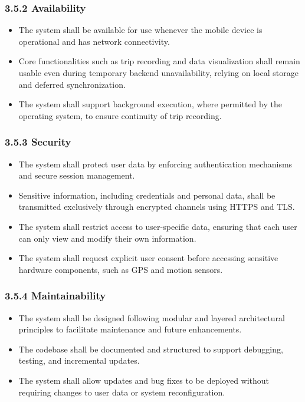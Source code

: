 \subsubsection{3.5.2 Availability}
\begin{itemize}
    \item The system shall be available for use whenever the mobile device is operational and has network connectivity.
    
    \item Core functionalities such as trip recording and data visualization shall remain usable even during temporary backend unavailability, relying on local storage and deferred synchronization.
    
    \item The system shall support background execution, where permitted by the operating system, to ensure continuity of trip recording.
\end{itemize}

\subsubsection{3.5.3 Security}
\begin{itemize}
    \item The system shall protect user data by enforcing authentication mechanisms and secure session management.
    
    \item Sensitive information, including credentials and personal data, shall be transmitted exclusively through encrypted channels using HTTPS and TLS.
    
    \item The system shall restrict access to user-specific data, ensuring that each user can only view and modify their own information.
    
    \item The system shall request explicit user consent before accessing sensitive hardware components, such as GPS and motion sensors.
\end{itemize}

\subsubsection{3.5.4 Maintainability}
\begin{itemize}
    \item The system shall be designed following modular and layered architectural principles to facilitate maintenance and future enhancements.
    
    \item The codebase shall be documented and structured to support debugging, testing, and incremental updates.
    
    \item The system shall allow updates and bug fixes to be deployed without requiring changes to user data or system reconfiguration.
\end{itemize}

